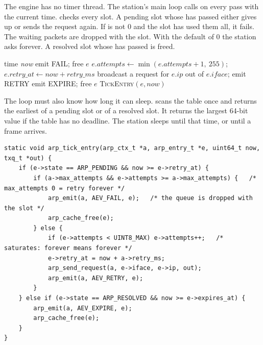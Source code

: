 The engine has no timer thread. The station's main loop calls  on every pass with the current time.  checks every slot. A pending slot whose  has passed either gives up or sends the request again. If  is not 0 and the slot has used them all, it fails. The waiting packets are dropped with the slot. With the default of 0 the station asks forever. A resolved slot whose  has passed is freed.

\begin{algorithm}[H]\small
\caption{Timer pass (, )}
\label{alg:tick}
\begin{algorithmic}[1]
\Require time \textit{now}
      \State emit FAIL; free $e$ 
    \Else
      \State $e.attempts \gets \min(e.attempts + 1,\ 255)$; $e.retry\_at \gets now + retry\_ms$
      \State broadcast a request for $e.ip$ out of $e.iface$; emit RETRY
    \EndIf
    \State emit EXPIRE; free $e$
  \EndIf
\EndFunction
{}
   \State \textsc{TickEntry}$(e, now)$
  \EndFor
\EndFunction
\end{algorithmic}
\end{algorithm}

The loop must also know how long it can sleep.  scans the table once and returns the earliest  of a pending slot or  of a resolved slot. It returns the largest 64-bit value if the table has no deadline. The station sleeps until that time, or until a frame arrives.

\begin{lstlisting}[style=corelst, firstnumber=113, caption={\code{src/arp.c}, lines 113--128: retry, fail and expire.}]
static void arp_tick_entry(arp_ctx_t *a, arp_entry_t *e, uint64_t now, txq_t *out) {
    if (e->state == ARP_PENDING && now >= e->retry_at) {
        if (a->max_attempts && e->attempts >= a->max_attempts) {   /* max_attempts 0 = retry forever */
            arp_emit(a, AEV_FAIL, e);   /* the queue is dropped with the slot */
            arp_cache_free(e);
        } else {
            if (e->attempts < UINT8_MAX) e->attempts++;   /* saturates: forever means forever */
            e->retry_at = now + a->retry_ms;
            arp_send_request(a, e->iface, e->ip, out);
            arp_emit(a, AEV_RETRY, e);
        }
    } else if (e->state == ARP_RESOLVED && now >= e->expires_at) {
        arp_emit(a, AEV_EXPIRE, e);
        arp_cache_free(e);
    }
}
\end{lstlisting}

